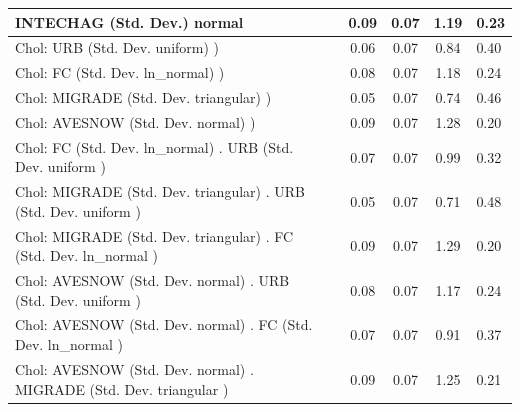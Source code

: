 \begin{table}
\begin{center}
\begin{tabular}{|l|l|c|c|c|l|}
			\hline
			INTECHAG (Std. Dev.) normal &  & 0.09 & 0.07 & 1.19 & 0.23 \\
			\hline
			 Chol: URB (Std. Dev. uniform) ) &  & 0.06 & 0.07 & 0.84 & 0.40 \\
			\hline
			 Chol: FC (Std. Dev. ln_normal) ) &  & 0.08 & 0.07 & 1.18 & 0.24 \\
			\hline
			 Chol: MIGRADE (Std. Dev. triangular) ) &  & 0.05 & 0.07 & 0.74 & 0.46 \\
			\hline
			 Chol: AVESNOW (Std. Dev. normal) ) &  & 0.09 & 0.07 & 1.28 & 0.20 \\
			\hline
			 Chol: FC (Std. Dev. ln_normal) . URB (Std. Dev.   uniform ) &  & 0.07 & 0.07 & 0.99 & 0.32 \\
			\hline
			 Chol: MIGRADE (Std. Dev. triangular) . URB (Std. Dev.   uniform ) &  & 0.05 & 0.07 & 0.71 & 0.48 \\
			\hline
			 Chol: MIGRADE (Std. Dev. triangular) . FC (Std. Dev.   ln_normal ) &  & 0.09 & 0.07 & 1.29 & 0.20 \\
			\hline
			 Chol: AVESNOW (Std. Dev. normal) . URB (Std. Dev.   uniform ) &  & 0.08 & 0.07 & 1.17 & 0.24 \\
			\hline
			 Chol: AVESNOW (Std. Dev. normal) . FC (Std. Dev.   ln_normal ) &  & 0.07 & 0.07 & 0.91 & 0.37 \\
			\hline
			 Chol: AVESNOW (Std. Dev. normal) . MIGRADE (Std. Dev.   triangular ) &  & 0.09 & 0.07 & 1.25 & 0.21 \\
			\hline
		\end{tabular}
	\end{center}
\end{table}